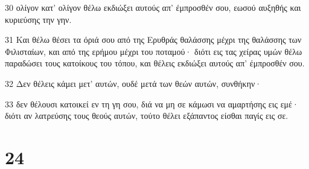 \par 30 ολίγον κατ' ολίγον θέλω εκδιώξει αυτούς απ' έμπροσθέν σου, εωσού αυξηθής και κυριεύσης την γην.
\par 31 Και θέλω θέσει τα όριά σου από της Ερυθράς θαλάσσης μέχρι της θαλάσσης των Φιλισταίων, και από της ερήμου μέχρι του ποταμού· διότι εις τας χείρας υμών θέλω παραδώσει τους κατοίκους του τόπου, και θέλεις εκδιώξει αυτούς απ' έμπροσθέν σου.
\par 32 Δεν θέλεις κάμει μετ' αυτών, ουδέ μετά των θεών αυτών, συνθήκην·
\par 33 δεν θέλουσι κατοικεί εν τη γη σου, διά να μη σε κάμωσι να αμαρτήσης εις εμέ· διότι αν λατρεύσης τους θεούς αυτών, τούτο θέλει εξάπαντος είσθαι παγίς εις σε.

\chapter{24}

